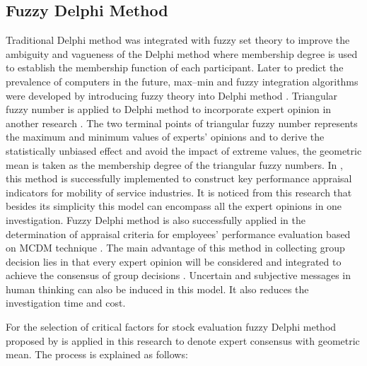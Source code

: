 \documentclass{ws-ijufks}
\begin{document}
\subsection{Fuzzy Delphi Method}
Traditional Delphi method was integrated with fuzzy set theory to improve the ambiguity and vagueness of the Delphi 
method \cite{Murry1985} where membership degree is used to establish the membership function of each participant. Later 
to predict the prevalence of computers in the future, max--min and fuzzy integration algorithms were developed by 
introducing fuzzy theory into Delphi method \cite{Ishikawa1993}. Triangular fuzzy number is applied to Delphi method to 
incorporate expert opinion in another research \cite{Hsu2000}. The two terminal points of triangular fuzzy 
number represents the maximum and minimum values of experts' opinions and to derive the statistically unbiased 
effect and avoid the impact of extreme values, the geometric mean is taken as the membership degree of the triangular 
fuzzy numbers. In \cite{Kuo2008}, this method is successfully implemented to construct key performance appraisal 
indicators for mobility of service industries. It is noticed from this research that besides its simplicity this model 
can encompass all the expert opinions in one investigation. Fuzzy Delphi method is also successfully applied in the 
determination of appraisal criteria for employees' performance evaluation based on MCDM technique 
\cite{Falsafi2011employees}. The main advantage of this method in collecting group decision lies in that every expert 
opinion will be considered and integrated to achieve the consensus of group decisions \cite{Kuo2008}. Uncertain and 
subjective messages in human thinking can also be induced in this model. It also reduces the investigation time and 
cost. 

For the selection of critical factors for stock evaluation fuzzy Delphi method proposed by \cite{Hsu2000} is applied in 
this research to denote expert consensus with geometric mean. The process is explained as follows:
\end{document}
